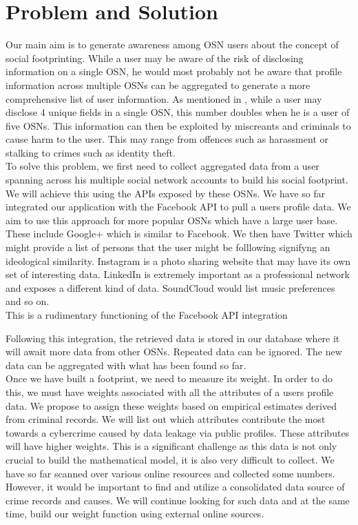 \documentclass[conference]{IEEEtran}
\begin{document}
\section{Problem and Solution}
Our main aim is to generate awareness among OSN users about the concept of social footprinting. While a user may be aware of the risk of disclosing information on a single OSN, he would most probably not be aware that profile information across multiple OSNs can be aggregated to generate a more comprehensive list of user information. As mentioned in \cite{emergingthreat}, while a user may disclose 4 unique fields in a single OSN, this number doubles when he is a user of five OSNs. This information can then be exploited by miscreants and criminals to cause harm to the user. This may range from offences such as harassment or stalking to crimes such as identity theft. \\

To solve this problem, we first need to collect aggregated data from a user spanning across his multiple social network accounts to build his social footprint. We will achieve this using the APIs exposed by these OSNs. We have so far integrated our application with the Facebook API to pull a users profile data. We aim to use this approach for more popular OSNs which have a large user base. These include Google+ which is similar to Facebook. We then have Twitter which might provide a list of persons that the user might be folllowing signifyng an ideological similarity. Instagram is a photo sharing website that may have its own set of interesting data. LinkedIn is extremely important as a professional network and exposes a different kind of data. SoundCloud would list music preferences and so on.\\

This is a rudimentary functioning of the Facebook API integration

Following this integration, the retrieved data is stored in our database where it will await more data from other OSNs. Repeated data can be ignored. The new data can be aggregated with what has been found so far.\\

Once we have built a footprint, we need to measure its weight. In order to do this, we must have weights associated with all the attributes of a users profile data. We propose to assign these weights based on empirical estimates derived from criminal records. We will list out which attributes contribute the most towards a cybercrime caused by data leakage via public profiles. These attributes will have higher weights. This is a significant challenge as this data is not only crucial to build the mathematical model, it is also very difficult to collect. We have so far scanned over various online resources and collected some numbers. However, it would be important to find and utilize a consolidated data source of crime records and causes. We will continue looking for such data and at the same time, build our weight function using external online sources.\\
\end{document}
